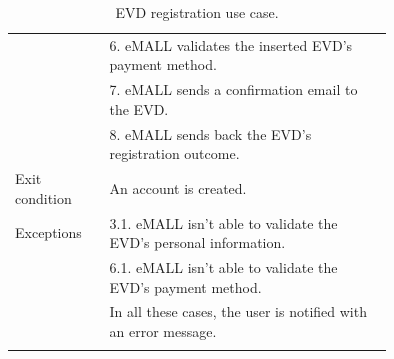 \begin{center}
\begin{longtable}{lp{0.75\linewidth}}
        & 6. eMALL validates the inserted EVD’s payment method.                                                                                                                                                 \\
        & 7. eMALL sends a confirmation email to the EVD.                                                                                                                                                       \\
        & 8. eMALL sends back the EVD’s registration outcome.                                                                                                                                                   \\
        \hline
        Exit condition   & An account is created.                                                                                                                                                                                \\
        \hline
        Exceptions       & 3.1. eMALL isn’t able to validate the EVD’s personal information.                                                                                                                                     \\
        & 6.1. eMALL isn’t able to validate the EVD’s payment method.                                                                                                                                           \\
        & In all these cases, the user is notified with an error message.                                                                                                                                       \\
        \hline
        \caption{EVD registration use case.}
        \label{tab: EVD_sign_up_use_case}
    \end{longtable}
\end{center}

